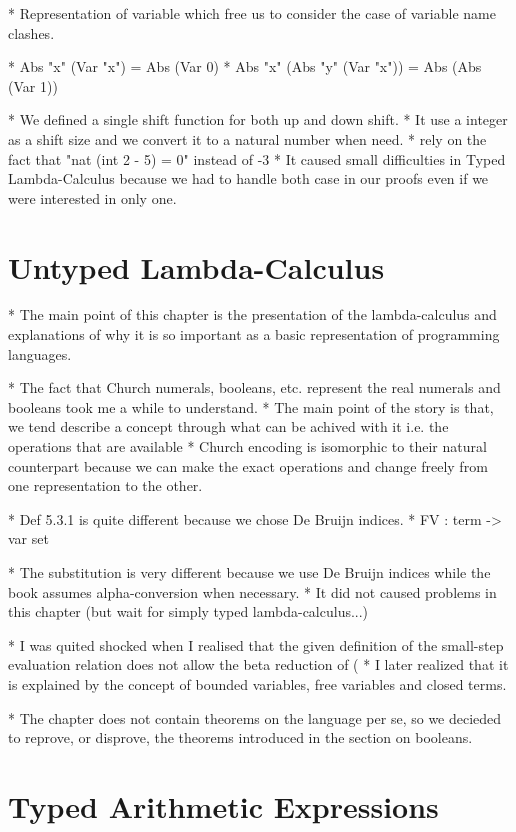 \documentclass[a4paper, oneside, 12pt, titlepage]{article}
\begin{document}
  * Representation of variable which free us to consider the case of variable name clashes.

  * Abs "x" (Var "x") = Abs (Var 0)
  * Abs "x" (Abs "y" (Var "x")) = Abs (Abs (Var 1))

  * We defined a single shift function for both up and down shift.
    * It use a integer as a shift size and we convert it to a natural number when need.
      * rely on the fact that "nat (int 2 - 5) = 0" instead of -3
    * It caused small difficulties in Typed Lambda-Calculus because we had to handle both case in
      our proofs even if we were interested in only one.

\section{Untyped Lambda-Calculus}

  * The main point of this chapter is the presentation of the lambda-calculus and explanations of
    why it is so important as a basic representation of programming languages.

  * The fact that Church numerals, booleans, etc. represent the real numerals and booleans took me a
    while to understand.
    * The main point of the story is that, we tend describe a concept through what can be achived
      with it i.e. the operations that are available
    * Church encoding is isomorphic to their natural counterpart because we can make the exact
      operations and change freely from one representation to the other.

  * Def 5.3.1 is quite different because we chose De Bruijn indices.
    * FV : term -> var set

  * The substitution is very different because we use De Bruijn indices while the book assumes
    alpha-conversion when necessary.
    * It did not caused problems in this chapter (but wait for simply typed lambda-calculus...)

  * I was quited shocked when I realised that the given definition of the small-step evaluation
    relation does not allow the beta reduction of (%
    * I later realized that it is explained by the concept of bounded variables, free variables and
      closed terms.

  * The chapter does not contain theorems on the language per se, so we decieded to reprove, or
    disprove, the theorems introduced in the section on booleans.

\section{Typed Arithmetic Expressions}
\end{document}
